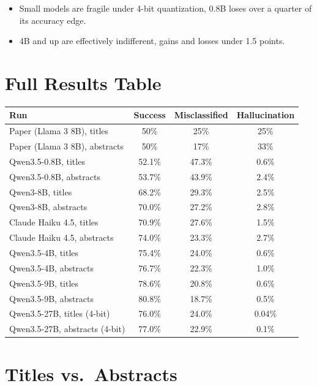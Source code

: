 \documentclass[12pt]{article}
\begin{document}
\begin{itemize}
    \item Small models are fragile under 4-bit quantization, 0.8B loses over a quarter of its accuracy edge.
    \item 4B and up are effectively indifferent, gains and losses under 1.5 points.
\end{itemize}

\FloatBarrier
\clearpage
\section{Full Results Table}

\begin{table}[h]
\centering
\small
\begin{tabular}{lccc}
\toprule
Run & Success & Misclassified & Hallucination \\
\midrule
Paper (Llama 3 8B), titles & 50\% & 25\% & 25\% \\
Paper (Llama 3 8B), abstracts & 50\% & 17\% & 33\% \\
Qwen3.5-0.8B, titles & 52.1\% & 47.3\% & 0.6\% \\
Qwen3.5-0.8B, abstracts & 53.7\% & 43.9\% & 2.4\% \\
Qwen3-8B, titles & 68.2\% & 29.3\% & 2.5\% \\
Qwen3-8B, abstracts & 70.0\% & 27.2\% & 2.8\% \\
Claude Haiku 4.5, titles & 70.9\% & 27.6\% & 1.5\% \\
Claude Haiku 4.5, abstracts & 74.0\% & 23.3\% & 2.7\% \\
Qwen3.5-4B, titles & 75.4\% & 24.0\% & 0.6\% \\
Qwen3.5-4B, abstracts & 76.7\% & 22.3\% & 1.0\% \\
Qwen3.5-9B, titles & 78.6\% & 20.8\% & 0.6\% \\
Qwen3.5-9B, abstracts & 80.8\% & 18.7\% & 0.5\% \\
Qwen3.5-27B, titles (4-bit) & 76.0\% & 24.0\% & 0.04\% \\
Qwen3.5-27B, abstracts (4-bit) & 77.0\% & 22.9\% & 0.1\% \\
\bottomrule
\end{tabular}
\end{table}

\FloatBarrier
\section{Titles vs.\ Abstracts}
\end{document}
